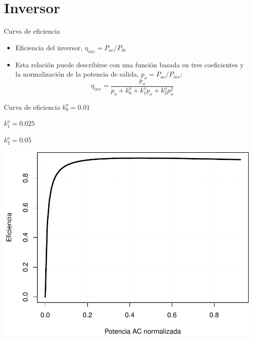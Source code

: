 \documentclass[xcolor={usenames,svgnames,dvipsnames}]{beamer}
\begin{document}
\section{Inversor}
\label{sec:orga899828}

\begin{frame}[label={sec:orgeebe35d}]{Curva de eficiencia}
\begin{itemize}
\item Eficiencia del inversor, \(\eta_{inv} = P_{ac} / P_{dc}\)

\item Esta relación puede describirse con una función basada en tres coeficientes y la normalización de la potencia de salida, \(p_{o}=P_{ac}/P_{inv}\): $$\eta_{inv}=\frac{p_{o}}{p_{o}+k_{0}^{o}+k_{1}^{o}p_{o}+k_{2}^{o}p_{o}^{2}}$$
\end{itemize}
\end{frame}


\begin{frame}[label={sec:org22dff68}]{Curva de eficiencia}
\(k_{0}^{o}=0.01\)

\(k_{1}^{o}=0.025\)

\(k_{2}^{o}=0.05\)

\begin{center}
\includegraphics[width=.9\linewidth]{../figs/CurvaInversor.pdf}
\end{center}
\end{frame}
\end{document}
